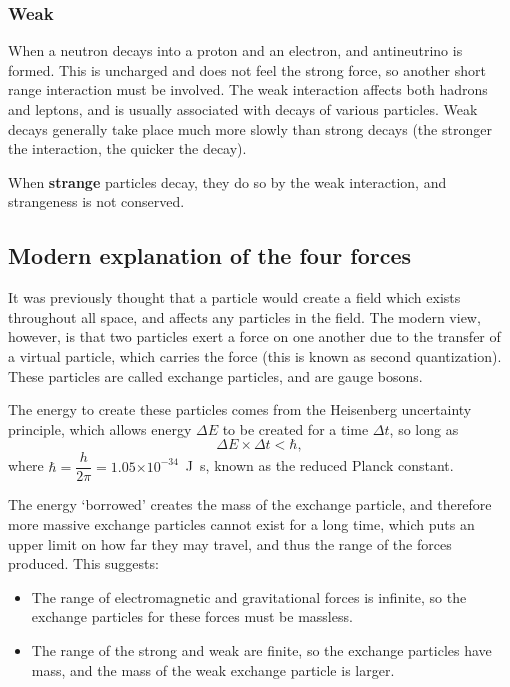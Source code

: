 \documentclass[a4paper,12pt]{article}
\providecommand{\e}[1]{\ensuremath{\times 10^{#1}}}
\begin{document}
\subsubsection{Weak}

When a neutron decays into a proton and an electron, and antineutrino is formed.  This is uncharged and does not feel the strong force, so another short range interaction must be involved.  The weak interaction affects both hadrons and leptons, and is usually associated with decays of various particles.  Weak decays generally take place much more slowly than strong decays (the stronger the interaction, the quicker the decay).

When {\bf strange} particles decay, they do so by the weak interaction, and strangeness is not conserved.

\subsection{Modern explanation of the four forces}

It was previously thought that a particle would create a field which exists throughout all space, and affects any particles in the field.  The modern view, however, is that two particles exert a force on one another due to the transfer of a virtual particle, which carries the force (this is known as second quantization).  These particles are called exchange particles, and are gauge bosons.

The energy to create these particles comes from the Heisenberg uncertainty principle, which allows energy $\Delta E$ to be created for a time $\Delta t$, so long as
\[\Delta E \times \Delta t < \hbar,\]
where $\hbar=\dfrac{h}{2\pi}=1.05\e{-34}$~J~s, known as the reduced Planck constant.

The energy `borrowed' creates the mass of the exchange particle, and therefore more massive exchange particles cannot exist for a long time, which puts an upper limit on how far they may travel, and thus the range of the forces produced.  This suggests:
\begin{itemize}
\item The range of electromagnetic and gravitational forces is infinite, so the exchange particles for these forces must be massless.
\item The range of the strong and weak are finite, so the exchange particles have mass, and the mass of the weak exchange particle is larger.
\end{itemize}
\end{document}
